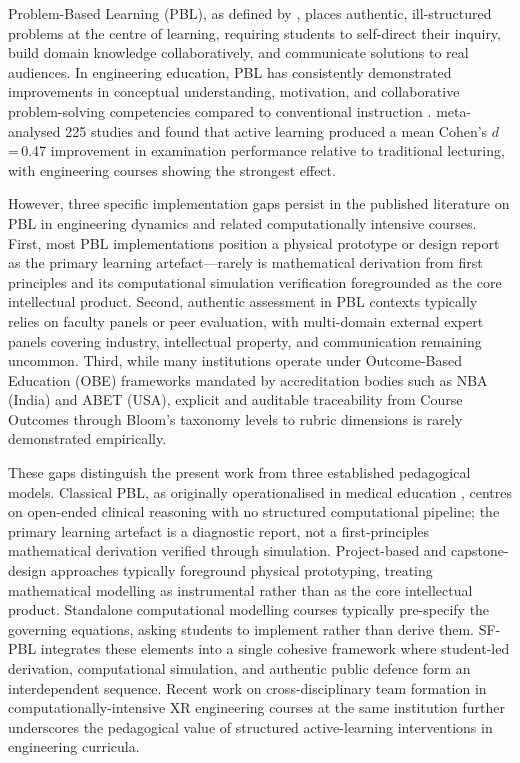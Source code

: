 \documentclass[utf8]{FrontiersinHarvard}
\begin{document}
Problem-Based Learning (PBL), as defined by \citet{hmelo2004problem}, places
authentic, ill-structured problems at the centre of learning, requiring
students to self-direct their inquiry, build domain knowledge collaboratively,
and communicate solutions to real audiences. In engineering education, PBL
has consistently demonstrated improvements in conceptual understanding,
motivation, and collaborative problem-solving competencies compared to
conventional instruction \citep{prince2006inductive, dym2005engineering,
dochy2003effects}. \citet{freeman2014active} meta-analysed 225 studies and
found that active learning produced a mean Cohen's $d$\,=\,0.47 improvement
in examination performance relative to traditional lecturing, with
engineering courses showing the strongest effect.

However, three specific implementation gaps persist in the published
literature on PBL in engineering dynamics and related computationally
intensive courses. First, most PBL implementations position a physical
prototype or design report as the primary learning artefact---rarely is
mathematical derivation from first principles and its computational
simulation verification foregrounded as the core intellectual product.
Second, authentic assessment in PBL contexts typically relies on faculty
panels or peer evaluation, with multi-domain external expert panels
covering industry, intellectual property, and communication remaining
uncommon. Third, while many institutions operate under Outcome-Based
Education (OBE) frameworks mandated by accreditation bodies such as
NBA (India) and ABET (USA), explicit and auditable traceability from
Course Outcomes through Bloom's taxonomy levels to rubric dimensions
is rarely demonstrated empirically.

{\color{blue} These gaps distinguish the present work from three established pedagogical
models. Classical PBL, as originally operationalised in medical education
\citep{hmelo2004problem}, centres on open-ended clinical reasoning with no
structured computational pipeline; the primary learning artefact is a
diagnostic report, not a first-principles mathematical derivation verified
through simulation. Project-based and capstone-design approaches
\citep{dym2005engineering} typically foreground physical prototyping, treating
mathematical modelling as instrumental rather than as the core intellectual
product. Standalone computational modelling courses
\citep{justo2021enhancing} typically pre-specify the governing equations,
asking students to implement rather than derive them. SF-PBL integrates
these elements into a single cohesive framework where student-led
derivation, computational simulation, and authentic public defence form an
interdependent sequence. Recent work on cross-disciplinary team formation in
computationally-intensive XR engineering courses at the same institution
\citep{nanade2026cross} further underscores the pedagogical value of
structured active-learning interventions in engineering curricula.}
\end{document}
